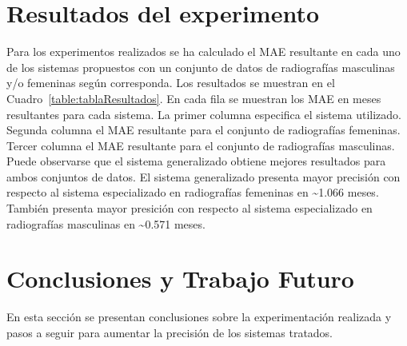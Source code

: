 \documentclass[conference]{IEEEtran}
\begin{document}
\section{Resultados del experimento}
Para los experimentos realizados se ha calculado el MAE resultante en cada uno de los sistemas propuestos con un conjunto de datos de radiografías masculinas y/o femeninas según corresponda. Los resultados se muestran en el Cuadro~\ref{table:tablaResultados}. En cada fila se muestran los MAE en meses resultantes para cada sistema. La primer columna especifica el sistema utilizado. Segunda columna el MAE resultante para el conjunto de radiografías femeninas. Tercer columna el MAE resultante para el conjunto de radiografías masculinas.
Puede observarse que el sistema generalizado obtiene mejores resultados para ambos conjuntos de datos. El sistema generalizado presenta mayor precisión con respecto al sistema especializado en radiografías femeninas en \textasciitilde{}1.066 meses. También presenta mayor presición con respecto al sistema especializado en radiografías masculinas en \textasciitilde{}0.571 meses.
\begin{table}[]
\centering
{}
\caption{MAE en meses de los sistemas de acuerdo al género de radiografía utilizado}
\label{table:tablaResultados}
\end{table}

\section{Conclusiones y Trabajo Futuro}

En esta sección se presentan conclusiones sobre la experimentación realizada y pasos a seguir para aumentar la precisión de los sistemas tratados.
\end{document}
